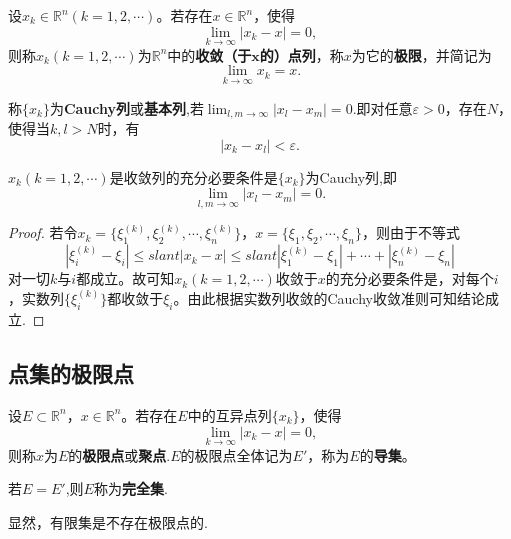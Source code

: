 \documentclass[../../main.tex]{subfiles}
\begin{document}
\begin{definition}
  设\(x_k\in\mathbb{R}^n(k = 1,2,\cdots)\)。若存在\(x\in\mathbb{R}^n\)，使得
\[\lim_{k\rightarrow\infty}|x_k - x| = 0,\]
则称\(x_k(k = 1,2,\cdots)\)为\(\mathbb{R}^n\)中的\textbf{收敛（于\(\boldsymbol{x}\)的）点列}，称\(x\)为它的\textbf{极限}，并简记为
\[\lim_{k\rightarrow\infty}x_k = x.\]
\end{definition}

\begin{definition}[Cauchy列]\label{definition:Cauchy列}
  称\(\{x_k\}\)为\textbf{Cauchy列}或\textbf{基本列},若$\lim_{l,m\rightarrow\infty}|x_l - x_m| = 0$.即对任意\(\varepsilon>0\)，存在\(N\)，使得当\(k,l>N\)时，有
\[|x_k - x_l|<\varepsilon.\]
\end{definition}

\begin{theorem}
  \(x_k(k = 1,2,\cdots)\)是收敛列的充分必要条件是\(\{x_k\}\)为Cauchy列,即
\[\lim_{l,m\rightarrow\infty}|x_l - x_m| = 0.\]
\end{theorem}
\begin{proof}
  若令\(x_k=\{\xi_1^{(k)},\xi_2^{(k)},\cdots,\xi_n^{(k)}\}\)，\(x = \{\xi_1,\xi_2,\cdots,\xi_n\}\)，则由于不等式
\[|\xi_i^{(k)} - \xi_i|\leqslant slant|x_k - x|\leqslant slant|\xi_1^{(k)} - \xi_1|+\cdots+|\xi_n^{(k)} - \xi_n|\]
对一切\(k\)与\(i\)都成立。故可知\(x_k(k = 1,2,\cdots)\)收敛于\(x\)的充分必要条件是，对每个\(i\)，实数列\(\{\xi_i^{(k)}\}\)都收敛于\(\xi_i\)。由此根据实数列收敛的Cauchy收敛准则可知结论成立.
\end{proof}

\subsection{点集的极限点}

\begin{definition}\label{definition:极限点、导集与完全集}
设\(E\subset\mathbb{R}^n\)，\(x\in\mathbb{R}^n\)。若存在\(E\)中的互异点列\(\{x_k\}\)，使得
\[\lim_{k\rightarrow\infty}|x_k - x| = 0,\]
则称\(x\)为\(E\)的\textbf{极限点}或\textbf{聚点}.\(E\)的极限点全体记为\(E'\)，称为\(E\)的\textbf{导集}。

若$E = E'$,则$E$称为\textbf{完全集}.
\end{definition}
\begin{note}
显然，有限集是不存在极限点的.
\end{note}
\end{document}
